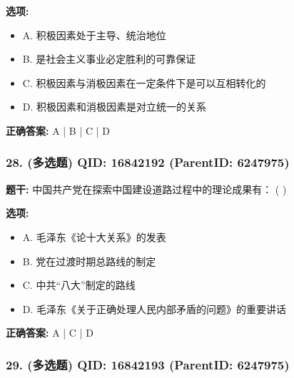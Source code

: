 \documentclass[12pt,UTF8]{ctexart}
\begin{document}
\textbf{选项:}
\begin{itemize}[leftmargin=*]

  \item A. 积极因素处于主导、统治地位

  \item B. 是社会主义事业必定胜利的可靠保证

  \item C. 积极因素与消极因素在一定条件下是可以互相转化的

  \item D. 积极因素和消极因素是对立统一的关系

\end{itemize}

\textbf{正确答案:}
A | B | C | D

\vspace{0.3em}\hrulefill\vspace{0.7em}

\subsubsection*{28. (多选题) \small QID: 16842192 (ParentID: 6247975)}

\textbf{题干:}
中国共产党在探索中国建设道路过程中的理论成果有： ( )



\textbf{选项:}
\begin{itemize}[leftmargin=*]

  \item A. 毛泽东《论十大关系》的发表

  \item B. 党在过渡时期总路线的制定

  \item C. 中共“八大”制定的路线

  \item D. 毛泽东《关于正确处理人民内部矛盾的问题》的重要讲话

\end{itemize}

\textbf{正确答案:}
A | C | D

\vspace{0.3em}\hrulefill\vspace{0.7em}

\subsubsection*{29. (多选题) \small QID: 16842193 (ParentID: 6247975)}
\end{document}
